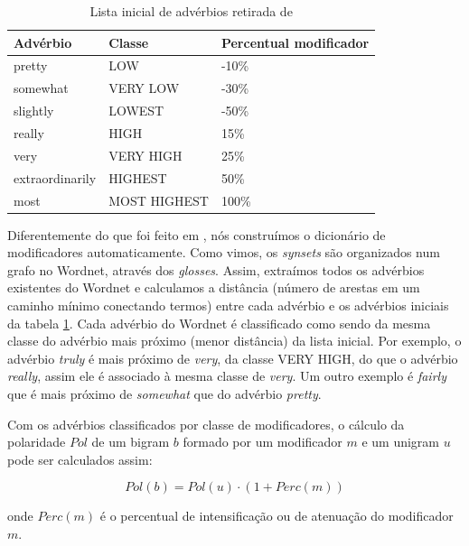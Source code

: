 \documentclass[template.tex]{subfiles}
\begin{document}
\begin{table}[!h]
	\centering
    \begin{tabular}{lll}
    Advérbio         				& Classe          & Percentual modificador \\ \hline
    pretty                   			& LOW 			   & -10\% \\
    somewhat                   	& VERY LOW  & -30\% \\
    slightly                   		& LOWEST 	   & -50\% \\
    really                   			& HIGH 			   & 15\% \\
    very                   			& VERY HIGH &  25\% \\
    extraordinarily             & HIGHEST 	   & 50\% \\
    most                   			& MOST HIGHEST & 100\% \\
    \end{tabular}
    \caption{Lista inicial de advérbios retirada de \cite{taboada2011lexicon}}
	\label{table:adv_seed}
\end{table}

Diferentemente do que foi feito em , nós construímos o dicionário de modificadores automaticamente. Como vimos, os \textit{synsets} são organizados num grafo no Wordnet, através dos \textit{glosses}. Assim, extraímos todos os advérbios existentes do Wordnet e calculamos a distância (número de arestas em um caminho mínimo conectando termos) entre cada advérbio e os advérbios iniciais da tabela \ref{table:adv_seed}. Cada advérbio do Wordnet é classificado como sendo da mesma classe do advérbio mais próximo (menor distância) da lista inicial. Por exemplo, o advérbio \textit{truly} é mais próximo de \textit{very}, da classe VERY HIGH, do que o advérbio \textit{really}, assim ele é associado à mesma classe de \textit{very}. Um outro exemplo é \textit{fairly} que é mais próximo de \textit{somewhat} que do advérbio \textit{pretty}. 

Com os advérbios classificados por classe de modificadores, o cálculo da polaridade $Pol$ de um bigram $b$ formado por um modificador $m$ e um unigram $u$ pode ser calculados assim: 

\begin{equation}
Pol(b) = Pol(u) \cdot (1 + Perc(m))
\label{eq:pol_bigrams}
\end{equation}

onde $Perc(m)$ é o percentual de intensificação ou de atenuação do modificador $m$. 
\end{document}
